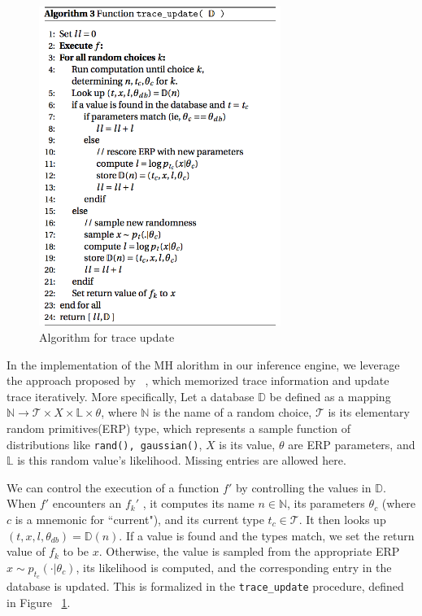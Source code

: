 \begin{figure}
    \centering
    \includegraphics[width=0.7\textwidth]{figures/trace2.png}
    \caption{Algorithm for trace update}
    \label{fig:trace2}
\end{figure}

In the implementation of the MH alorithm in our inference engine, we leverage the approach proposed by ~\cite{lightweight}, which memorized trace information and update trace iteratively. More specifically, Let a database $\mathbb{D}$ be defined as a mapping $ \mathbb{N} \rightarrow \mathscr{T} \times X \times \mathbb{L} \times \theta$, where $\mathbb{N}$ is the name of a random choice, $\mathscr{T}$ is its elementary random primitives(ERP) type, which represents a sample function of distributions like \texttt{rand(), gaussian()}, $X$ is its value, $\theta$ are ERP parameters, and $\mathbb{L}$ is this random value's likelihood. Missing entries are allowed here.

We can control the execution of a function $f'$ by controlling the values in $\mathbb{D}$. When $f'$ encounters an $f_k'$ , it computes its name $n \in \mathbb{N}$, its parameters $\theta_c$ (where $c$ is a mnemonic for ``current"), and its current type $t_c \in \mathscr{T}$. It then looks up $(t,x,l,\theta_{db}) = \mathbb{D}(n)$. If a value is found and the types match, we set the return value of $f_k$ to be $x$. Otherwise, the value is sampled from the appropriate ERP $x \sim p_{t_c}(\cdot|\theta_c)$, its likelihood is computed, and the corresponding entry in the database is updated. This is formalized in the \texttt{trace\_update} procedure, defined in Figure ~\ref{fig:trace2}.

